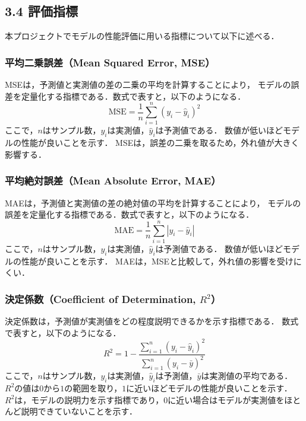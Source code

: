 \subsection*{3.4 評価指標}
本プロジェクトでモデルの性能評価に用いる指標について以下に述べる．

\subsubsection*{平均二乗誤差（Mean Squared Error, MSE）}
MSEは，予測値と実測値の差の二乗の平均を計算することにより，
モデルの誤差を定量化する指標である．数式で表すと，以下のようになる．
\begin{equation}
  \label{eq:mse}
  \mathrm{MSE} = \frac{1}{n} \sum_{i=1}^{n} (y_i - \hat{y}_i)^2
\end{equation}
ここで，$n$はサンプル数，$y_i$は実測値，$\hat{y}_i$は予測値である．
数値が低いほどモデルの性能が良いことを示す．
MSEは，誤差の二乗を取るため，外れ値が大きく影響する．

\subsubsection*{平均絶対誤差（Mean Absolute Error, MAE）}
MAEは，予測値と実測値の差の絶対値の平均を計算することにより，
モデルの誤差を定量化する指標である．数式で表すと，以下のようになる．
\begin{equation}
  \label{eq:mae}
  \mathrm{MAE} = \frac{1}{n} \sum_{i=1}^{n} |y_i - \hat{y}_i|
\end{equation}
ここで，$n$はサンプル数，$y_i$は実測値，$\hat{y}_i$は予測値である．
数値が低いほどモデルの性能が良いことを示す．
MAEは，MSEと比較して，外れ値の影響を受けにくい．

\subsubsection*{決定係数（Coefficient of Determination, $R^2$）}
決定係数は，予測値が実測値をどの程度説明できるかを示す指標である．  
数式で表すと，以下のようになる．
\begin{equation}
  \label{eq:r2}
  R^2 = 1 - \frac{\sum_{i=1}^{n} (y_i - \hat{y}_i)^2}{\sum_{i=1}^{n} (y_i - \bar{y})^2}
\end{equation}
ここで，$n$はサンプル数，$y_i$は実測値，$\hat{y}_i$は予測値，$\bar{y}$は実測値の平均である．
$R^2$の値は$0$から$1$の範囲を取り，$1$に近いほどモデルの性能が良いことを示す．
$R^2$は，モデルの説明力を示す指標であり，$0$に近い場合はモデルが実測値をほとんど説明できていないことを示す．